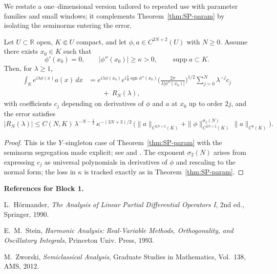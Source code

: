 We restate a one–dimensional version tailored to repeated use with parameter families and small windows; it complements Theorem~\ref{thm:SP-param} by isolating the seminorms entering the error.

\begin{theorem}
\label{thm:SP-1d-explicit}
Let $U\subset\mathbb{R}$ open, $K\Subset U$ compact, and let $\phi,a\in C^{2N+2}(U)$ with $N\ge0$. Assume there exists $x_0\in K$ such that
\[
\phi'(x_0)=0,\qquad |\phi''(x_0)|\ge \kappa>0,\qquad
\operatorname{supp} a \subset K .
\]
Then, for $\lambda\ge1$,
\begin{align*}
\int_{\mathbb{R}} e^{i\lambda \phi(x)} a(x)\,dx
&= e^{i\lambda \phi(x_0)} e^{i\frac{\pi}{4}\operatorname{sgn}\phi''(x_0)}
\Big(\tfrac{2\pi}{\lambda |\phi''(x_0)|}\Big)^{1/2}
\sum_{j=0}^{N} \lambda^{-j} c_j \\
&\qquad +\ R_N(\lambda),
\end{align*}
with coefficients $c_j$ depending on derivatives of $\phi$ and $a$ at $x_0$ up to order $2j$, and the error satisfies
\[
|R_N(\lambda)| \le C(N,K)\, \lambda^{-N-\frac12}\,
\kappa^{-(3N+3)/2}\,
\Big( \|a\|_{C^{2N+2}(K)} + \|\phi\|_{C^{2N+2}(K)}^{\sigma_2(N)}\, \|a\|_{C^{0}(K)} \Big).
\]
\end{theorem}

\begin{proof}
This is the $Y$–singleton case of Theorem~\ref{thm:SP-param} with the seminorm segregation made explicit; see \cite[Thm.~7.7.5]{HormanderI} and \cite[App.~A]{Zworski}. The exponent $\sigma_2(N)$ arises from expressing $c_j$ as universal polynomials in derivatives of $\phi$ and rescaling to the normal form; the loss in $\kappa$ is tracked exactly as in Theorem~\ref{thm:SP-param}.
\end{proof}

\medskip

\noindent\textbf{References for Block 1.}
\begin{thebibliography}{99}
L.~H\"ormander, \emph{The Analysis of Linear Partial Differential Operators I}, 2nd ed., Springer, 1990.

E.~M.~Stein, \emph{Harmonic Analysis: Real-Variable Methods, Orthogonality, and Oscillatory Integrals}, Princeton Univ. Press, 1993.

M.~Zworski, \emph{Semiclassical Analysis}, Graduate Studies in Mathematics, Vol.~138, AMS, 2012.
\end{thebibliography}

